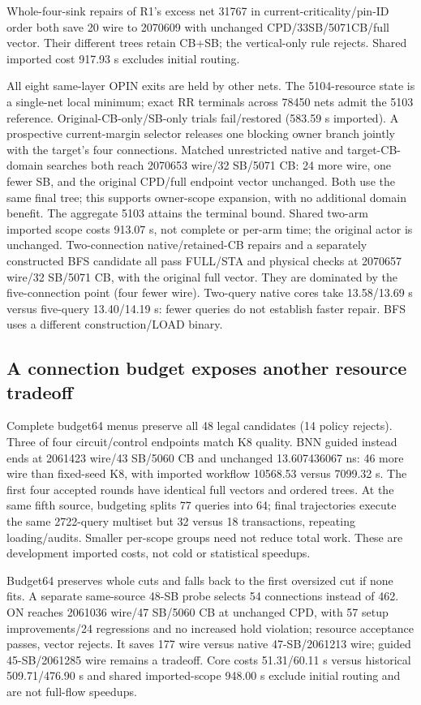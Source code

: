 \documentclass[conference,10pt]{IEEEtran}
\begin{document}
Whole-four-sink repairs of R1's excess net 31767 in current-criticality/pin-ID order both save 20 wire to 2070609 with unchanged CPD/33SB/5071CB/full vector. Their different trees retain CB+SB; the vertical-only rule rejects. Shared imported cost 917.93 s excludes initial routing.

All eight same-layer OPIN exits are held by other nets. The 5104-resource state is a single-net local minimum; exact RR terminals across 78450 nets admit the 5103 reference. Original-CB-only/SB-only trials fail/restored (583.59 s imported). A prospective current-margin selector releases one blocking owner branch jointly with the target's four connections. Matched unrestricted native and target-CB-domain searches both reach 2070653 wire/32 SB/5071 CB: 24 more wire, one fewer SB, and the original CPD/full endpoint vector unchanged. Both use the same final tree; this supports owner-scope expansion, with no additional domain benefit. The aggregate 5103 attains the terminal bound. Shared two-arm imported scope costs 913.07 s, not complete or per-arm time; the original actor is unchanged. Two-connection native/retained-CB repairs and a separately constructed BFS candidate all pass FULL/STA and physical checks at 2070657 wire/32 SB/5071 CB, with the original full vector. They are dominated by the five-connection point (four fewer wire). Two-query native cores take 13.58/13.69 s versus five-query 13.40/14.19 s: fewer queries do not establish faster repair. BFS uses a different construction/LOAD binary.

\subsection{A connection budget exposes another resource tradeoff}
Complete budget64 menus preserve all 48 legal candidates (14 policy rejects). Three of four circuit/control endpoints match K8 quality. BNN guided instead ends at 2061423 wire/43 SB/5060 CB and unchanged 13.607436067 ns: 46 more wire than fixed-seed K8, with imported workflow 10568.53 versus 7099.32 s. The first four accepted rounds have identical full vectors and ordered trees. At the same fifth source, budgeting splits 77 queries into 64; final trajectories execute the same 2722-query multiset but 32 versus 18 transactions, repeating loading/audits. Smaller per-scope groups need not reduce total work. These are development imported costs, not cold or statistical speedups.

Budget64 preserves whole cuts and falls back to the first oversized cut if none fits. A separate same-source 48-SB probe selects 54 connections instead of 462. ON reaches 2061036 wire/47 SB/5060 CB at unchanged CPD, with 57 setup improvements/24 regressions and no increased hold violation; resource acceptance passes, vector rejects. It saves 177 wire versus native 47-SB/2061213 wire; guided 45-SB/2061285 wire remains a tradeoff. Core costs 51.31/60.11 s versus historical 509.71/476.90 s and shared imported-scope 948.00 s exclude initial routing and are not full-flow speedups.
\end{document}
